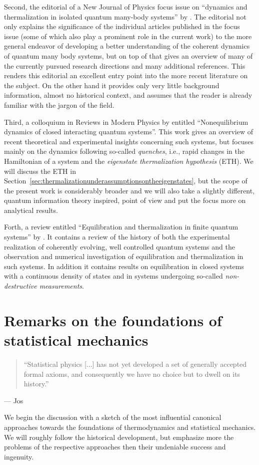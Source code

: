 \documentclass[a4paper,12pt,listof=totoc,index=totoc,bibliography=totoc,headsepline=false,headings=normal,BCOR16.153846mm,DIV12,headinclude,twoside,cleardoublepage=empty,numbers=noenddot,final]{scrreprt}
\theoremstyle{mystyle}
\numberwithin{equation}{section}
\numberwithin{figure}{section}
\numberwithin{lemma}{section}
\numberwithin{theorem}{section}
\numberwithin{corollary}{section}
\numberwithin{definition}{section}
\numberwithin{conjecture}{section}
\numberwithin{observation}{section}
\newcommand{\+}{\mkern2mu}
\DeclareMathOperator{\1}{\mathds{1}}
\begin{document}
Second, the editorial of a New Journal of Physics focus issue on ``dynamics and thermalization in isolated quantum many-body systems'' by \textcite{Cazalilla2010}.
The editorial not only explains the significance of the individual articles published in the focus issue (some of which also play a prominent role in the current work) to the more general endeavor of developing a better understanding of the coherent dynamics of quantum many body systems, but on top of that gives an overview of many of the currently pursued research directions and many additional references.
This renders this editorial an excellent entry point into the more recent literature on the subject.
On the other hand it provides only very little background information, almost no historical context, and assumes that the reader is already familiar with the jargon of the field.

Third, a colloquium in Reviews in Modern Physics by \textcite{Polkovnikov11} entitled ``Nonequilibrium dynamics of closed interacting quantum systems''. 
This work gives an overview of recent theoretical and experimental insights concerning such systems, but focuses mainly on the dynamics following so-called \emph{quenches}, i.e., rapid changes in the Hamiltonian of a system and the \emph{eigenstate thermalization hypothesis} (ETH).
We will discuss the ETH in Section~\ref{sec:thermalizationunderassumptionsontheeigenstates}, but the scope of the present work is considerably broader and we will also take a slightly different, quantum information theory inspired, point of view and put the focus more on analytical results.

Forth, a review entitled ``Equilibration and thermalization in finite quantum systems'' by \textcite{Yukalov2011}.
It contains a review of the history of both the experimental realization of coherently evolving, well controlled quantum systems and the observation and numerical investigation of equilibration and thermalization in such systems.
In addition it contains results on equilibration in closed systems with a continuous density of states and in systems undergoing so-called \emph{non-destructive measurements}.


\chapter{Remarks on the foundations of statistical mechanics}
\label{chap:remarksonthefoundationsofstatmech}
%
\begin{quotation}
  ``Statistical physics [...] has not yet developed a set of generally accepted formal axioms, and consequently we have no choice but to dwell on its history.''
\end{quotation}
\begin{flushright}
  --- Jos \textcite{UffinkFinal}
\end{flushright}
%
We begin the discussion with a sketch of the most influential canonical approaches towards the foundations of thermodynamics and statistical mechanics.
We will roughly follow the historical development, but emphasize more the problems of the respective approaches then their undeniable success and ingenuity.
\end{document}
